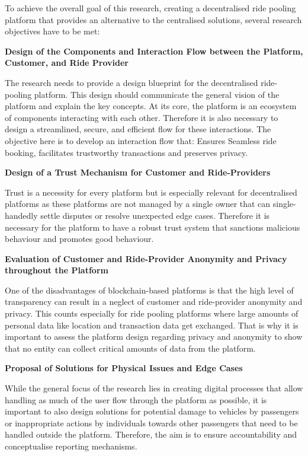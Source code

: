 To achieve the overall goal of this research, creating a decentralised ride pooling platform that provides an alternative to the centralised solutions, several research objectives have to be met:

\textbf{Design of the Components and Interaction Flow between the Platform, Customer, and Ride Provider}

The research needs to provide a design blueprint for the decentralised ride-pooling platform. This design should communicate the general vision of the platform and explain the key concepts.
At its core, the platform is an ecosystem of components interacting with each other. 
Therefore it is also necessary to design a streamlined, secure, and efficient flow for these interactions. The objective here is to develop an interaction flow that: Ensures Seamless ride booking, facilitates trustworthy transactions and preserves privacy.


\textbf{Design of a Trust Mechanism for Customer and Ride-Providers}

Trust is a necessity for every platform but is especially relevant for decentralised platforms as these platforms are not managed by a single owner that can single-handedly  settle disputes or resolve unexpected edge cases. Therefore it is necessary for the platform to have a robust trust system that sanctions malicious behaviour and promotes  good behaviour.


\textbf{Evaluation of Customer and Ride-Provider Anonymity and Privacy throughout the Platform}

One of the disadvantages of blockchain-based platforms is that the high level of transparency can result in a neglect of customer and ride-provider anonymity and privacy. This counts especially for ride pooling platforms where large amounts of personal data like location and transaction data get exchanged. That is why it is important to assess the platform design regarding privacy and anonymity to show that no entity can collect critical amounts of data from the platform.


\textbf{Proposal of Solutions for Physical Issues and Edge Cases}

While the general focus of the research lies in creating digital processes that allow handling as much of the user flow through the platform as possible, it is important to also design solutions for  potential damage to vehicles by passengers or inappropriate actions by individuals towards other passengers that need to be handled outside the platform. Therefore, the aim is to ensure accountability and conceptualise reporting mechanisms.

